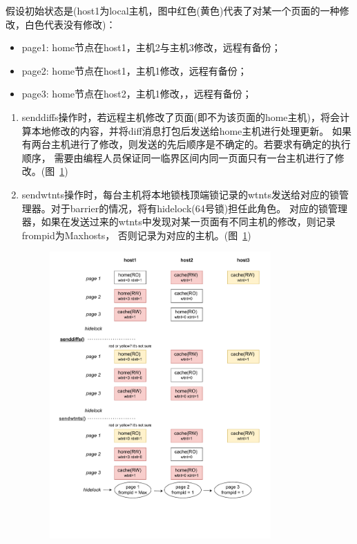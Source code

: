 {    假设初始状态是(host1为local主机，图中红色(黄色)代表了对某一个页面的一种修改，白色代表没有修改)：
    \begin{itemize}
        \item page1: home节点在host1，主机2与主机3修改，远程有备份；
        \item page2: home节点在host1，主机1修改，远程有备份；
        \item page3: home节点在host2，主机1修改，，远程有备份；
    \end{itemize}
    \begin{enumerate}[label=\arabic*.]
        \item senddiffs操作时，若远程主机修改了页面(即不为该页面的home主机)，将会计算本地修改的内容，并将diff消息打包后发送给home主机进行处理更新。
              如果有两台主机进行了修改，则发送的先后顺序是不确定的。若要求有确定的执行顺序，
              需要由编程人员保证同一临界区间内同一页面只有一台主机进行了修改。(图~\ref{fig:JIAJIA-barrier1})
        \item sendwtnts操作时，每台主机将本地锁栈顶端锁记录的wtnts发送给对应的锁管理器。对于barrier的情况，将有hidelock(64号锁)担任此角色。
              对应的锁管理器，如果在发送过来的wtnts中发现对某一页面有不同主机的修改，则记录frompid为Maxhosts，
              否则记录为对应的主机。(图~\ref{fig:JIAJIA-barrier1})

              \newpage
              \begin{figure}[!htbp]
                  \centering
                  \includegraphics[width=0.8\textwidth,page=1]{Img/jiajia_barr_sync.drawio.pdf}
                  \label{fig:JIAJIA-barrier1}
              \end{figure}


\end{enumerate}}
